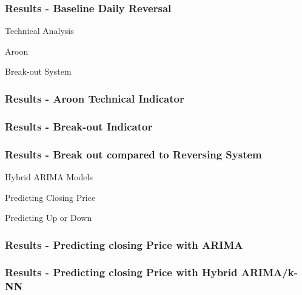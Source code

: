 \documentclass{beamer}
\begin{document}
\begin{frame}
\frametitle{Results - Baseline Daily Reversal}



\end{frame}

\begin{frame}
\Huge{\centerline{Technical Analysis}}
\Huge{\centerline{ }}
\Huge{\centerline{Aroon}}
\Huge{\centerline{Break-out System}}
\end{frame}

\begin{frame}
\frametitle{Results - Aroon Technical Indicator}



\end{frame}

\begin{frame}
\frametitle{Results - Break-out Indicator}


\end{frame}

\begin{frame}
\frametitle{Results - Break out compared to Reversing System}


\end{frame}

\begin{frame}
\Huge{\centerline{Hybrid ARIMA Models}}
\Huge{\centerline{ }}
\Huge{\centerline{Predicting Closing Price}}
\Huge{\centerline{Predicting Up or Down}}
\end{frame}

\begin{frame}
\frametitle{Results - Predicting closing Price with ARIMA}



\end{frame}

\begin{frame}
\frametitle{Results - Predicting closing Price with Hybrid ARIMA/k-NN}

%


\end{frame}
\end{document}
